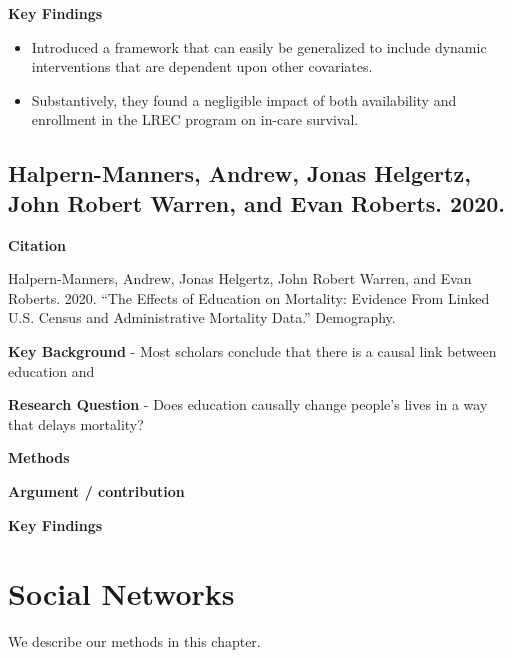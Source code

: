 \documentclass[
]{book}
\providecommand{\tightlist}{%
  \setlength{\itemsep}{0pt}\setlength{\parskip}{0pt}}
\begin{document}
\textbf{Key Findings}

\begin{itemize}
\tightlist
\item
  Introduced a framework that can easily be generalized to include dynamic interventions that are dependent upon other covariates.
\item
  Substantively, they found a negligible impact of both availability and enrollment in the LREC program on in-care survival.
\end{itemize}

\hypertarget{halpern-manners-andrew-jonas-helgertz-john-robert-warren-and-evan-roberts.-2020.}{%
\section{Halpern-Manners, Andrew, Jonas Helgertz, John Robert Warren, and Evan Roberts. 2020.}\label{halpern-manners-andrew-jonas-helgertz-john-robert-warren-and-evan-roberts.-2020.}}

\textbf{Citation}

Halpern-Manners, Andrew, Jonas Helgertz, John Robert Warren, and Evan Roberts. 2020. ``The Effects of Education on Mortality: Evidence From Linked U.S. Census and Administrative Mortality Data.'' Demography.

\textbf{Key Background}
- Most scholars conclude that there is a causal link between education and

\textbf{Research Question}
- Does education causally change people's lives in a way that delays mortality?

\textbf{Methods}

\textbf{Argument / contribution}

\textbf{Key Findings}

\hypertarget{social-networks}{%
\chapter{Social Networks}\label{social-networks}}

We describe our methods in this chapter.

  
\end{document}

